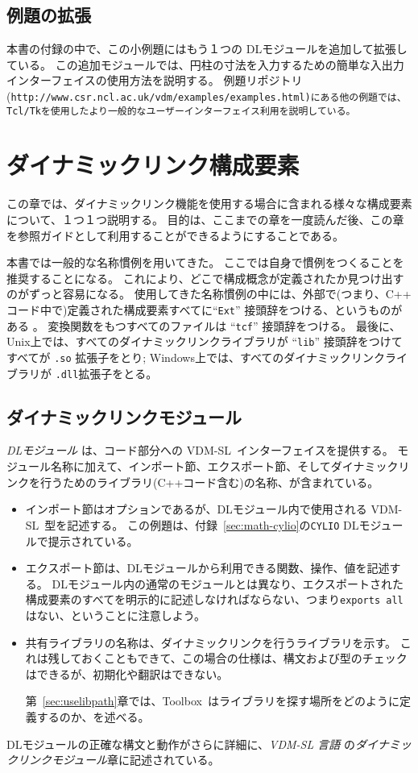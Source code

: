\documentclass[\pformat,12pt]{jarticle}
\newcommand{\vdmslpp}{VDM-SL}
\newcommand{\Toolbox}{Toolbox}
\begin{document}
\subsection*{例題の拡張}

本書の付録の中で、この小例題にはもう１つの DLモジュールを追加して拡張している。
この追加モジュールでは、円柱の寸法を入力するための簡単な入出力インターフェイスの使用方法を説明する。
例題リポジトリ \\(\tt http://www.csr.ncl.ac.uk/vdm/examples/examples.html)にある他の例題では、Tcl/Tkを使用したより一般的なユーザーインターフェイス利用を説明している。
 
\section{ダイナミックリンク構成要素}
\label{sec:dlcomponents}

この章では、ダイナミックリンク機能を使用する場合に含まれる様々な構成要素について、１つ１つ説明する。 
目的は、ここまでの章を一度読んだ後、この章を参照ガイドとして利用することができるようにすることである。

本書では一般的な名称慣例を用いてきた。
ここでは自身で慣例をつくることを推奨することになる。 
これにより、どこで構成概念が定義されたか見つけ出すのがずっと容易になる。 
使用してきた名称慣例の中には、外部で(つまり、C++ コード中で)定義された構成要素すべてに``{\tt Ext}'' 接頭辞をつける、というものがある 。 
変換関数をもつすべてのファイルは ``{\tt tcf}'' 接頭辞をつける。
最後に、Unix上では、すべてのダイナミックリンクライブラリが ``{\tt lib}'' 接頭辞をつけてすべてが {\tt .so} 拡張子をとり;
Windows上では、すべてのダイナミックリンクライブラリが \texttt{.dll}拡張子をとる。

\subsection{ダイナミックリンクモジュール}

 {\em DLモジュール} は、コード部分への \vdmslpp\ インターフェイスを提供する。
モジュール名称に加えて、インポート節、エクスポート節、そしてダイナミックリンクを行うためのライブラリ(C++コード含む)の名称、が含まれている。
\begin{itemize}
\item インポート節はオプションであるが、DLモジュール内で使用される \vdmslpp\ 型を記述する。
この例題は、付録~\ref{sec:math-cylio}の{\tt CYLIO} DLモジュールで提示されている。
\item エクスポート節は、DLモジュールから利用できる関数、操作、値を記述する。
DLモジュール内の通常のモジュールとは異なり、エクスポートされた構成要素のすべてを明示的に記述しなければならない、つまり{\tt exports all}はない、ということに注意しよう。
\item 共有ライブラリの名称は、ダイナミックリンクを行うライブラリを示す。
これは残しておくこともできて、この場合の仕様は、構文および型のチェックはできるが、初期化や翻訳はできない。
  
  第~\ref{sec:uselibpath}章では、\Toolbox\ はライブラリを探す場所をどのように定義するのか、を述べる。
\end{itemize}
DLモジュールの正確な構文と動作がさらに詳細に、{\em VDM-SL 言語} \cite{LangMan-SCSK}の{\em ダイナミックリンクモジュール}章に記述されている。
\end{document}

